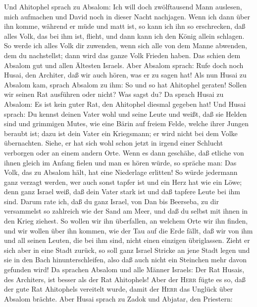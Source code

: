  Und Ahitophel sprach zu Absalom: Ich will doch
zwölftausend Mann auslesen, mich aufmachen und David noch in dieser
Nacht nachjagen.  Wenn ich dann über ihn komme, während er
müde und matt ist, so kann ich ihn so erschrecken, daß alles Volk, das
bei ihm ist, flieht, und dann kann ich den König allein schlagen.
 So werde ich alles Volk dir zuwenden, wenn sich alle von
dem Manne abwenden, dem du nachstellst; dann wird das ganze Volk Frieden
haben.  Das schien dem Absalom gut und allen Ältesten
Israels.  Aber Absalom sprach: Rufe doch noch Husai, den
Architer, daß wir auch hören, was er zu sagen hat!  Als
nun Husai zu Absalom kam, sprach Absalom zu ihm: So und so hat Ahitophel
geraten! Sollen wir seinen Rat ausführen oder nicht? Was sagst du?
 Da sprach Husai zu Absalom: Es ist kein guter Rat, den
Ahitophel diesmal gegeben hat!  Und Husai sprach: Du
kennst deinen Vater wohl und seine Leute und weißt, daß sie Helden sind
und grimmigen Mutes, wie eine Bärin auf freiem Felde, welche ihrer
Jungen beraubt ist; dazu ist dein Vater ein Kriegsmann; er wird nicht
bei dem Volke übernachten.  Siehe, er hat sich wohl schon
jetzt in irgend einer Schlucht verborgen oder an einem andern Orte. Wenn
es dann geschähe, daß etliche von ihnen gleich im Anfang fielen und man
es hören würde, so spräche man: Das Volk, das zu Absalom hält, hat eine
Niederlage erlitten!  So würde jedermann ganz verzagt
werden, wer auch sonst tapfer ist und ein Herz hat wie ein Löwe; denn
ganz Israel weiß, daß dein Vater stark ist und daß tapfere Leute bei ihm
sind.  Darum rate ich, daß du ganz Israel, von Dan bis
Beerseba, zu dir versammelst so zahlreich wie der Sand am Meer, und daß
du selbst mit ihnen in den Krieg ziehest.  So wollen wir
ihn überfallen, an welchem Orte wir ihn finden, und wir wollen über ihn
kommen, wie der Tau auf die Erde fällt, daß wir von ihm und all seinen
Leuten, die bei ihm sind, nicht einen einzigen übriglassen.
 Zieht er sich aber in eine Stadt zurück, so soll ganz
Israel Stricke an jene Stadt legen und sie in den Bach
hinunterschleifen, also daß auch nicht ein Steinchen mehr davon gefunden
wird!  Da sprachen Absalom und alle Männer Israels: Der
Rat Husais, des Architers, ist besser als der Rat Ahitophels! Aber der
\textsc{Herr} fügte es so, daß der gute Rat Ahitophels vereitelt wurde,
damit der \textsc{Herr} das Unglück über Absalom brächte.
 Aber Husai sprach zu Zadok und Abjatar, den Priestern:
